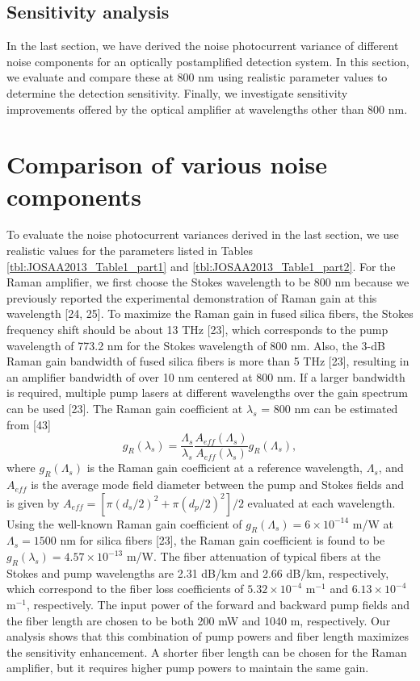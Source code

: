 \subsection{Sensitivity analysis}

In the last section, we have derived the noise photocurrent variance of different noise components for an optically postamplified detection system. In this section, we evaluate and compare these at 800 nm using realistic parameter values to determine the detection sensitivity. Finally, we investigate sensitivity improvements offered by the optical amplifier at wavelengths other than 800 nm.

\section{Comparison of various noise components}

To evaluate the noise photocurrent variances derived in the last section, we use realistic values for the parameters listed in Tables \ref{tbl:JOSAA2013_Table1_part1} and \ref{tbl:JOSAA2013_Table1_part2}. For the Raman amplifier, we first choose the Stokes wavelength to be 800 nm because we previously reported the experimental demonstration of Raman gain at this wavelength [24, 25]. To maximize the Raman gain in fused silica fibers, the Stokes frequency shift should be about 13 THz [23], which corresponds to the pump wavelength of 773.2 nm for the Stokes wavelength of 800 nm. Also, the 3-dB Raman gain bandwidth of fused silica fibers is more than 5 THz [23], resulting in an amplifier bandwidth of over 10 nm centered at 800 nm. If a larger bandwidth is required, multiple pump lasers at different wavelengths over the gain spectrum can be used [23]. The Raman gain coefficient at $\lambda_s$ = 800 nm can be estimated from [43]
\begin{equation}
g_R(\lambda_s)=\frac{\Lambda_s}{\lambda_s}\frac{A_{eff}(\Lambda_s)}{A_{eff}(\lambda_s)}g_R(\Lambda_s),
\end{equation}
where $g_R(\Lambda_s)$ is the Raman gain coefficient at a reference wavelength, $\Lambda_s$, and $A_{eff}$ is the average mode field diameter between the pump and Stokes fields and is given by $A_{eff}=[\pi(d_s/2)^2+\pi(d_p/2)^2]/2$ evaluated at each wavelength. Using the well-known Raman gain coefficient of $g_R(\Lambda_s)= 6 \times 10^{-14}$ m/W at $\Lambda_s = 1500$ nm for silica fibers [23], the Raman gain coefficient is found to be $g_R(\lambda_s) =  4.57 \times 10^{-13}$ m/W.
The fiber attenuation of typical fibers at the Stokes and pump wavelengths are 2.31 dB/km and 2.66 dB/km, respectively, which correspond to the fiber loss coefficients of $5.32 \times 10^{-4}$ m$^{-1}$ and $6.13 \times 10^{-4}$ m$^{-1}$, respectively. The input power of the forward and backward pump fields and the fiber length are chosen to be both 200 mW and 1040 m, respectively. Our analysis shows that this combination of pump powers and fiber length maximizes the sensitivity enhancement. A shorter fiber length can be chosen for the Raman amplifier, but it requires higher pump powers to maintain the same gain.

